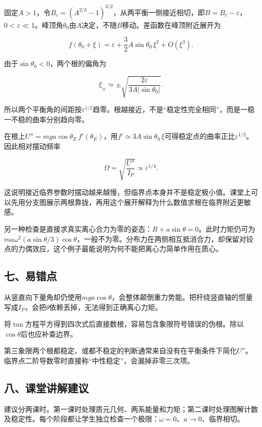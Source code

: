 \documentclass[12pt,a4paper,fontset=fandol]{ctexart}
\begin{document}
固定\(A>1\)，令\(B_c=(A^{2/3}-1)^{3/2}\)，从两平衡一侧接近相切，即\(B=B_c-\varepsilon\)，\(0<\varepsilon\ll1\)。峰顶角\(\theta_0\)由\(A\)决定，不随\(B\)移动。差函数在峰顶附近展开为

\[
f(\theta_0+\xi)
=\varepsilon+\frac32A\sin\theta_0\,\xi^2
+O(\xi^3).
\]

由于\(\sin\theta_0<0\)，两个根的偏角为

\[
\xi_\pm\simeq\pm
\sqrt{\frac{2\varepsilon}{3A|\sin\theta_0|}}.
\]

所以两个平衡角的间距按\(\varepsilon^{1/2}\)趋零。根越接近，不是``稳定性完全相同''，而是一稳一不稳的曲率分别趋向零。

在根上\(U''=mga\cos\theta_E\,f'(\theta_E)\)，用\(f'\simeq3A\sin\theta_0\,\xi\)可得稳定点的曲率正比\(\varepsilon^{1/2}\)。因此相对摆动频率

\[
\Omega=\sqrt{\frac{U''}{I_P}}\propto\varepsilon^{1/4}.
\]

这说明接近临界参数时摆动越来越慢，但临界点本身并不是稳定极小值。课堂上可以先用分支图展示两根靠拢，再用这个展开解释为什么数值求根在临界附近更敏感。

另一种检查是直接求真实离心合力为零的姿态：\(R+a\sin\theta=0\)。此时力矩仍可为\(ma\omega^2(a\sin\theta/3)\cos\theta\)，一般不为零。分布力在两侧相互抵消合力，却保留对铰点的力偶效应，这个例子最能说明为何不能把离心力简单作用在质心。

\subsection{七、易错点}\label{ux4e03ux6613ux9519ux70b9-3}

从竖直向下量角却仍使用\(mga\cos\theta\)，会整体颠倒重力势能。把杆绕竖直轴的惯量写成\(I_P\)，会把\(\theta\)依赖丢掉，无法得到正确离心力矩。

将\(\tan\)方程平方得到四次式后直接数根，容易包含象限符号错误的伪根。除以\(\cos\theta\)后也应补查边界。

第三象限两个根都稳定、或都不稳定的判断通常来自没有在平衡条件下简化\(U''\)。临界点二阶导数零时直接称``中性稳定''，会漏掉非零三次项。

\subsection{八、课堂讲解建议}\label{ux516bux8bfeux5802ux8bb2ux89e3ux5efaux8bae-3}

建议分两课时。第一课时处理质元几何、两系能量和力矩；第二课时处理图解计数及稳定性。每个阶段都让学生独立检查一个极限：\(\omega=0\)、\(a\to0\)、临界相切。
\end{document}
